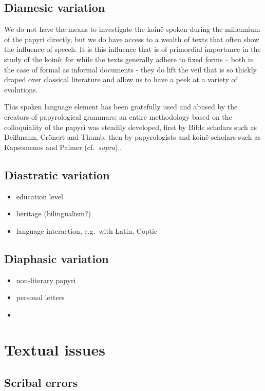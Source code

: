 \subsection{Diamesic variation}
\label{subsect:diamesic}

We do not have the means to investigate the koin\^e spoken during the millennium
of the papyri directly, but we do have access to a wealth of texts that often
show the influence of speech. It is this influence that is of primordial
importance in the study of the koin\^e; for while the texts generally adhere to
fixed forms – both in the case of formal as informal documents - they do lift
the veil that is so thickly draped over classical literature and allow us to
have a peek at a variety of evolutions.

This spoken language element has been gratefully used and abused by the
creators of papyrological grammars; an entire methodology based on the
colloquiality of the papyri was steadily developed, first by Bible scholars
such as Deißmann, Crönert and Thumb, then by papyrologists and koin\^e
scholars such as Kapsomenos and Palmer (cf.\ \emph{supra})..
\subsection{Diastratic variation}
\label{subsect:diastratic}
\begin{itemize}

\item education level
\item heritage (bilingualism?)
\item language interaction, e.g.\ with Latin, Coptic
\end{itemize}
\subsection{Diaphasic variation}
\label{subsect:diaphasic}
\begin{itemize}
\item non-literary papyri
\item personal letters
\item
\end{itemize}
\section{Textual issues}
\label{sect:textualissues}
\subsection{Scribal errors}
\label{subsect:scribalerrors}

